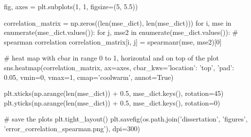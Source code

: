 fig, axes = plt.subplots(1, 1, figsize=(5, 5.5))

correlation_matrix = np.zeros((len(mse_dict), len(mse_dict)))
for i, mse in enumerate(mse_dict.values()):
    for j, mse2 in enumerate(mse_dict.values()):
        # spearman correlation
        correlation_matrix[i, j] = spearmanr(mse, mse2)[0]

# heat map with cbar in range 0 to 1, horizontal and on top of the plot
sns.heatmap(correlation_matrix, ax=axes, cbar_kws={'location': 'top', 'pad': 0.05}, vmin=0, vmax=1, cmap='coolwarm', annot=True)

plt.xticks(np.arange(len(mse_dict)) + 0.5, mse_dict.keys(), rotation=45)
plt.yticks(np.arange(len(mse_dict)) + 0.5, mse_dict.keys(), rotation=0)

# save the plots
plt.tight_layout()
plt.savefig(os.path.join('dissertation', 'figures', 'error_correlation_spearman.png'), dpi=300)